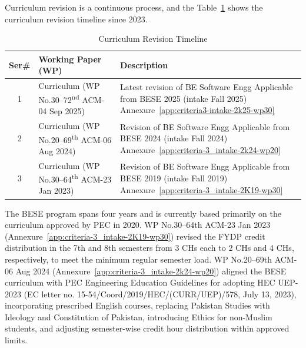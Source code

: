 
Curriculum revision is a continuous process, and the Table~\ref{tab:Revision_of_BESE_Curriculum} shows the curriculum revision timeline since 2023.
\begin{table}[htbp]
\centering
\footnotesize %
\renewcommand{\arraystretch}{0.85} %
\caption{Curriculum Revision Timeline}
\label{tab:Revision_of_BESE_Curriculum}
\begin{tabular}{c >{\raggedright\arraybackslash}p{} >{\raggedright\arraybackslash}p{}}
\toprule
\textbf{Ser\#} & \textbf{Working Paper (WP)} & \textbf{Description} \\
\midrule

1 & Curriculum (WP No.30--72\textsuperscript{nd} ACM-04 Sep 2025) 
  & Latest revision of BE Software Engg \newline 
    Applicable from BESE 2025 (intake Fall 2025) \newline 
    Annexure~\ref{app:criteria3-intake-2k25-wp30} \\ \addlinespace

2 & Curriculum (WP No.20--69\textsuperscript{th} ACM-06 Aug 2024) 
  & Revision of BE Software Engg \newline 
    Applicable from BESE 2024 (intake Fall 2024) \newline 
    Annexure~\ref{app:criteria-3_intake-2k24-wp20} \\ \addlinespace

3 & Curriculum (WP No.30--64\textsuperscript{th} ACM-23 Jan 2023) 
  & Revision of BE Software Engg \newline 
    Applicable from BESE 2019 (intake Fall 2019) \newline 
    Annexure~\ref{app:criteria-3_intake-2K19-wp30} \\

\bottomrule
\end{tabular}
\end{table}
The BESE program spans four years and is currently based primarily on the curriculum approved by PEC in 2020. WP No.30--64th ACM-23 Jan 2023 (Annexure~\ref{app:criteria-3_intake-2K19-wp30}) revised the FYDP credit distribution in the 7th and 8th semesters from 3 CHs each to 2 CHs and 4 CHs, respectively, to meet the minimum regular semester load. WP No.20--69th ACM-06 Aug 2024 (Annexure~\ref{app:criteria-3_intake-2k24-wp20}) aligned the BESE curriculum with PEC Engineering Education Guidelines for adopting HEC UEP-2023 (EC letter no. 15-54/Coord/2019/HEC/(CURR/UEP)/578, July 13, 2023), incorporating prescribed English courses, replacing Pakistan Studies with Ideology and Constitution of Pakistan, introducing Ethics for non-Muslim students, and adjusting semester-wise credit hour distribution within approved limits.

